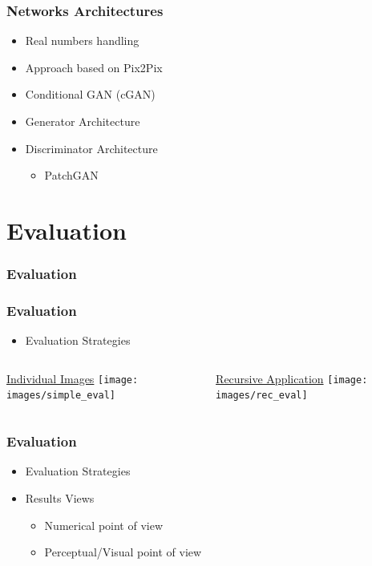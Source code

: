\documentclass[18pt, xcolor=table]{beamer}
\begin{document}
\begin{frame}[t]
  \frametitle{Networks Architectures}
  \begin{itemize}
  \item Real numbers handling
  \item Approach based on Pix2Pix
  \item Conditional GAN (cGAN)
  \item Generator Architecture
  \item Discriminator Architecture
    \begin{itemize}
    \item PatchGAN
    \end{itemize}
  \end{itemize}

\end{frame}

\section{Evaluation}

\begin{frame}[t]
  \frametitle{Evaluation}
\end{frame}

\begin{frame}[t]
  \frametitle{Evaluation}
  \begin{itemize}
  \item Evaluation Strategies
  \end{itemize}
  \vspace{-0.7cm}
  \begin{columns}[t]
    \begin{column}{0.5\textwidth}
      \begin{center}
        {\large \underline{Individual Images}}
        \texttt{[image: images/simple\_eval]}
      \end{center}
    \end{column}
    \begin{column}{0.5\textwidth}
      \begin{center}
        {\large \underline{Recursive Application}}
        \texttt{[image: images/rec\_eval]}
      \end{center}
    \end{column}
  \end{columns}
\end{frame}

\begin{frame}[t]
  \frametitle{Evaluation}
  \begin{itemize}
  \item Evaluation Strategies
  \item Results Views
    \begin{itemize}
    \item Numerical point of view
    \item Perceptual\slash Visual point of view
    \end{itemize}
  \end{itemize}
\end{frame}
\end{document}

